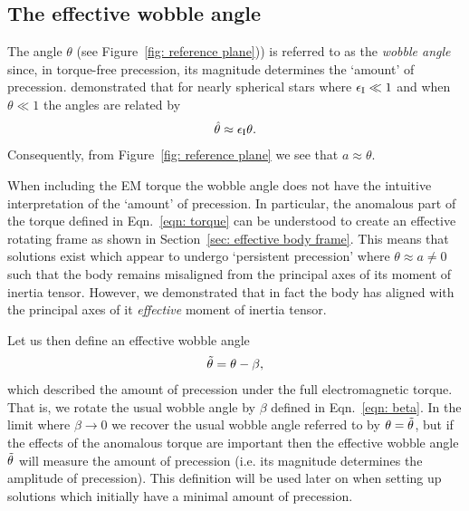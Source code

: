 \documentclass[../full_thesis/full_thesis.tex]{subfiles}
\begin{document}
\subsection{The effective wobble angle}
\label{sec: wobble angle}
The angle $\theta$ (see Figure~\ref{fig: reference plane})) is referred to as the
\emph{wobble angle} since, in torque-free precession, its magnitude determines
the `amount' of precession. \citet{Jones2001} demonstrated that
for nearly spherical stars where $\epsilon_{\mathrm{I}} \ll 1$ and when $\theta \ll 1$ the
angles are related by
\begin{align}
\hat{\theta} \approx \epsilon_{\mathrm{I}}\theta.
\label{eqn: theta hat theta}
\end{align}
Consequently, from Figure~\ref{fig: reference plane} we see that $a\approx
\theta$.

When including the EM torque the wobble angle
does not have the intuitive interpretation of the `amount' of precession.  In
particular, the anomalous part of the torque defined in Eqn.~\eqref{eqn: torque}
can be understood to create an effective rotating frame as shown in Section~\ref{sec:
effective body frame}. This means that solutions exist which appear to undergo
`persistent precession' where $\theta \approx a\ne0$ such that the body remains
misaligned from the principal axes of its moment of inertia tensor. However, we
demonstrated that in fact the body has aligned with the principal axes of
it \emph{effective} moment of inertia tensor.

Let us then define an effective wobble angle
\begin{align}
\tilde{\theta} = \theta - \beta,
\label{eqn: effective wobble angle}
\end{align}
which described the amount of precession under the full electromagnetic torque.
That is, we rotate the usual wobble angle by $\beta$ defined in
Eqn.~\eqref{eqn: beta}. In the limit where $\beta \rightarrow 0$ we recover the
usual wobble angle referred to by \citet{Jones2001} $\theta = \tilde{\theta}$,
but if the effects of the anomalous torque are important then the effective
wobble angle $\tilde{\theta}$ will measure the amount of precession (i.e. its
magnitude determines the amplitude of precession). This definition will be used
later on when setting up solutions which initially have a minimal amount of
precession.
\end{document}
